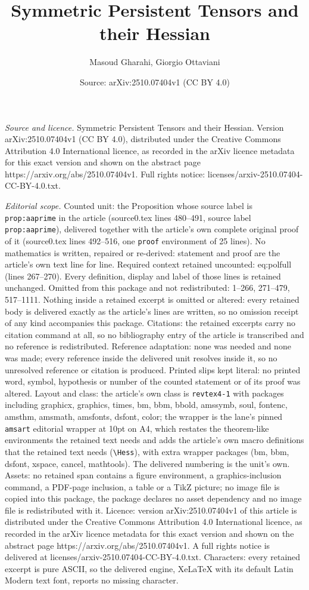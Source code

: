 \documentclass[10pt,a4paper]{amsart}
\title[Symmetric Persistent Tensors and their Hessian]{Symmetric Persistent Tensors and their Hessian}
\author{Masoud Gharahi, Giorgio Ottaviani}
\date{Source: arXiv:2510.07404v1 (CC BY 4.0)}
\begin{document}
\maketitle

\noindent\emph{Source and licence.} Symmetric Persistent Tensors and their Hessian. Version arXiv:2510.07404v1 (CC BY 4.0), distributed under the Creative Commons Attribution 4.0 International licence, as recorded in the arXiv licence metadata for this exact version and shown on the abstract page https://arxiv.org/abs/2510.07404v1. Full rights notice: licenses/arxiv-2510.07404-CC-BY-4.0.txt.\par\smallskip

\noindent\textit{Editorial scope.} Counted unit: the Proposition whose source label is \texttt{prop:aaprime} in the article (source0.tex lines 480--491, source label \texttt{prop:aaprime}), delivered together with the article's own complete original proof of it (source0.tex lines 492--516, one \texttt{proof} environment of 25 lines). No mathematics is written, repaired or re-derived: statement and proof are the article's own text line for line. Required context retained uncounted: eq:polfull (lines 267--270). Every definition, display and label of those lines is retained unchanged. Omitted from this package and not redistributed: 1--266, 271--479, 517--1111. Nothing inside a retained excerpt is omitted or altered: every retained body is delivered exactly as the article's lines are written, so no omission receipt of any kind accompanies this package. Citations: the retained excerpts carry no citation command at all, so no bibliography entry of the article is transcribed and no reference is redistributed. Reference adaptation: none was needed and none was made; every reference inside the delivered unit resolves inside it, so no unresolved reference or citation is produced. Printed slips kept literal: no printed word, symbol, hypothesis or number of the counted statement or of its proof was altered. Layout and class: the article's own class is \texttt{revtex4-1} with packages including graphicx, graphics, times, bm, bbm, bbold, amssymb, soul, fontenc, amsthm, amsmath, amsfonts, dsfont, color; the wrapper is the lane's pinned \texttt{amsart} editorial wrapper at 10pt on A4, which restates the theorem-like environments the retained text needs and adds the article's own macro definitions that the retained text needs (\texttt{\textbackslash Hess}), with extra wrapper packages (bm, bbm, dsfont, xspace, cancel, mathtools). The delivered numbering is the unit's own. Assets: no retained span contains a figure environment, a graphics-inclusion command, a PDF-page inclusion, a table or a TikZ picture; no image file is copied into this package, the package declares no asset dependency and no image file is redistributed with it. Licence: version arXiv:2510.07404v1 of this article is distributed under the Creative Commons Attribution 4.0 International licence, as recorded in the arXiv licence metadata for this exact version and shown on the abstract page https://arxiv.org/abs/2510.07404v1. A full rights notice is delivered at licenses/arxiv-2510.07404-CC-BY-4.0.txt. Characters: every retained excerpt is pure ASCII, so the delivered engine, XeLaTeX with its default Latin Modern text font, reports no missing character.
\end{document}
